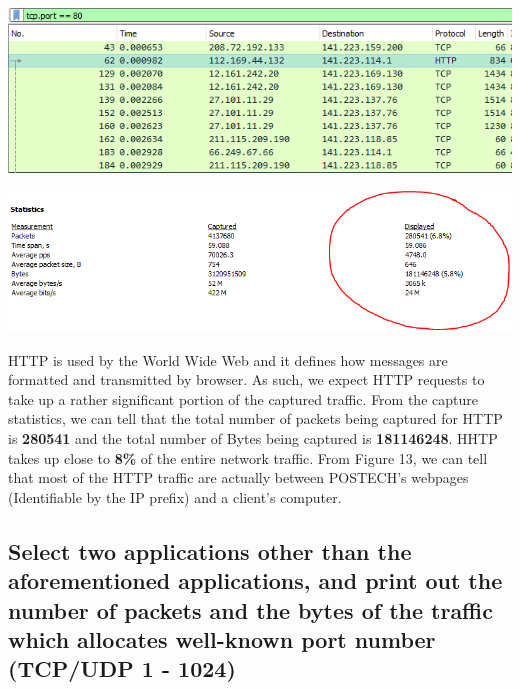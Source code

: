\documentclass[a4paper,11pt]{article}
\begin{document}
\begin{enumerate}
\begin{minipage}{3in}
	\centering
		\includegraphics[width = 16cm]{httpfilter}
		\captionsetup{justification=centering}
	\end{minipage}
	\newline\newline
	\begin{minipage}{5in}
	\centering
		\includegraphics[width = 16cm]{httppacketsnbytes}
		\captionsetup{justification=centering}
	\end{minipage}
	\newline\newline
	HTTP is used by the World Wide Web and it defines how messages are formatted and transmitted by browser. As such, we expect HTTP requests to take up a rather significant portion of the captured traffic. From the capture statistics, we can tell that the total number of packets being captured for HTTP is \textbf{280541} and the total number of Bytes being captured is \textbf{181146248}. HHTP takes up close to \textbf{8\%} of the entire network traffic. From Figure 13, we can tell that most of the HTTP traffic are actually between POSTECH's webpages (Identifiable by the IP prefix) and a client's computer. \newline
\end{enumerate}
\subsection{Select  two  applications  other  than  the  aforementioned  applications,  and  print  out  the  number  of packets and the bytes of the traffic which allocates well-known  port  number  (TCP/UDP 1 - 1024) }
\end{document}
